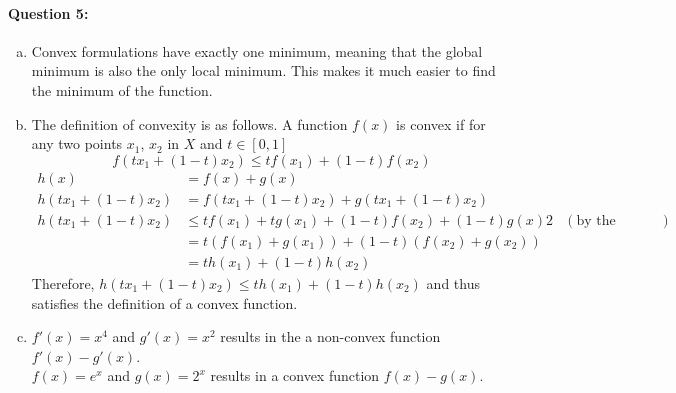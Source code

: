 \documentclass[letterpaper,11pt]{article}
\begin{document}
\paragraph{Question 5:}
\begin{enumerate}[(a)]
\item Convex formulations have exactly one minimum, meaning that the global minimum is also the only local minimum. This makes
  it much easier to find the minimum of the function.
\item
  The definition of convexity is as follows. A function $f(x)$ is convex if for any two points $x_1$, $x_2$ in $X$ and $t \in [0,1]$
  \begin{equation}
    f(t x_1 + (1 - t) x_2) \leq t f(x_1) + (1-t) f(x_2)
  \end{equation}
  \begin{align}
    h(x) & = f(x) + g(x)\\
    h(t x_1 + (1 - t) x_2) & = f(t x_1 + (1 - t) x_2) + g(t x_1 + (1 - t) x_2)\\
    h(t x_1 + (1 - t) x_2) & \leq t f(x_1) + t g(x_1) + (1-t)f(x_2) + (1-t) g(x)2 & (\text{by the definition of convexity})\\
                           & = t(f(x_1) + g(x_1)) + (1-t)(f(x_2) + g(x_2))\\
                           & = th(x_1) + (1-t)h(x_2)
  \end{align}
  Therefore, $h(t x_1 + (1 - t) x_2) \leq th(x_1) + (1-t)h(x_2)$ and thus satisfies the definition of a convex function.
\item $f'(x) = x^4$ and $g'(x) = x^2$ results in the a non-convex function $f'(x) - g'(x)$.\\
  $f(x) = e^x$ and $g(x) = 2^x$ results in a convex function $f(x) - g(x)$.
\end{enumerate}
\end{document}
